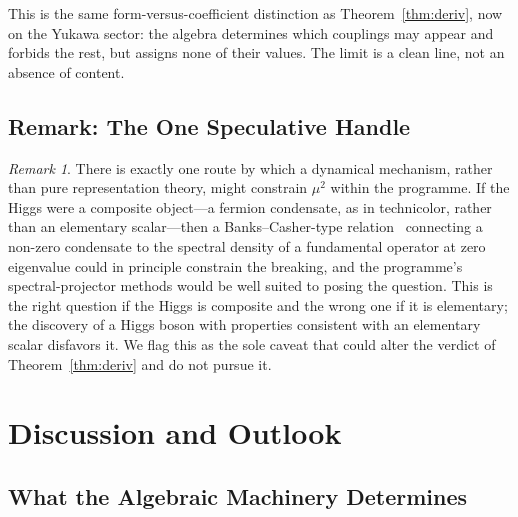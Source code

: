 \documentclass[12pt]{article}
\theoremstyle{remark}
\newtheorem{remark}[theorem]{Remark}
\begin{document}
This is the same form-versus-coefficient distinction as
Theorem~\ref{thm:deriv}, now on the Yukawa sector: the algebra determines which
couplings may appear and forbids the rest, but assigns none of their values.
The limit is a clean line, not an absence of content.

\subsection{Remark: The One Speculative Handle}
\label{sec:deriv-bankscasher}

\begin{remark}
	\label{rem:bankscasher}
	There is exactly one route by which a dynamical mechanism, rather than pure
	representation theory, might constrain $\mu^2$ within the programme.  If the
	Higgs were a composite object---a fermion condensate, as in technicolor,
	rather than an elementary scalar---then a Banks--Casher-type
	relation~\cite{BanksCasher1980} connecting a non-zero condensate to the
	spectral density of a fundamental operator at zero eigenvalue could in
	principle constrain the breaking, and the programme's spectral-projector
	methods would be well suited to posing the question.  This is the right
	question if the Higgs is composite and the wrong one if it is elementary;
	the discovery of a Higgs boson with properties consistent with an
	elementary scalar disfavors it.  We flag this as the sole caveat that could
	alter the verdict of Theorem~\ref{thm:deriv} and do not pursue it.
\end{remark}

\section{Discussion and Outlook}
\label{sec:discussion}

\subsection{What the Algebraic Machinery Determines}
\label{sec:can-do}
\end{document}
